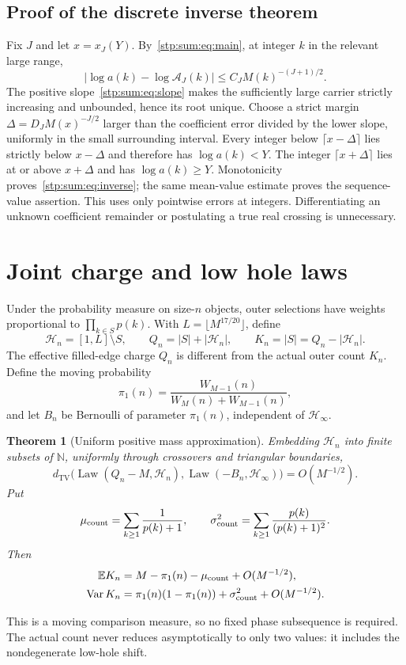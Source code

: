 \documentclass[11pt]{article}
\newtheorem{theorem}{Theorem}[section]
\theoremstyle{remark}\newtheorem{remark}[theorem]{Remark}
\newcommand{\E}{\mathbb E}
\newcommand{\N}{\mathbb N}
\newcommand{\TV}{d_{\mathrm{TV}}}
\newcommand{\cA}{\mathcal A}
\newcommand{\cH}{\mathcal H}
\DeclareMathOperator{\Var}{Var}
\DeclareMathOperator{\Law}{Law}
\begin{document}
\subsection{Proof of the discrete inverse theorem}
Fix $J$ and let $x=x_J(Y)$. By~\eqref{stp:sum:eq:main}, at integer $k$ in the relevant large range,
\[
 |\log a(k)-\log\cA_J(k)|\le C_JM(k)^{-(J+1)/2}.
\]
The positive slope~\eqref{stp:sum:eq:slope} makes the sufficiently large carrier strictly increasing and unbounded, hence its root unique. Choose a strict margin $\Delta=D_JM(x)^{-J/2}$ larger than the coefficient error divided by the lower slope, uniformly in the small surrounding interval. Every integer below $\lceil x-\Delta\rceil$ lies strictly below $x-\Delta$ and therefore has $\log a(k)<Y$. The integer $\lceil x+\Delta\rceil$ lies at or above $x+\Delta$ and has $\log a(k)\ge Y$. Monotonicity proves~\eqref{stp:sum:eq:inverse}; the same mean-value estimate proves the sequence-value assertion. This uses only pointwise errors at integers. Differentiating an unknown coefficient remainder or postulating a true real crossing is unnecessary.

\section{Joint charge and low hole laws}
\label{stp:sum:sec:TV}
Under the probability measure on size-$n$ objects, outer selections have weights proportional to $\prod_{k\in S}p(k)$. With $L=\lfloor M^{17/20}\rfloor$, define
\[
 \cH_n=[1,L]\setminus S,\qquad Q_n=|S|+|\cH_n|,
 \qquad K_n=|S|=Q_n-|\cH_n|.
\]
The effective filled-edge charge $Q_n$ is different from the actual outer count $K_n$. Define the moving probability
\[
 \pi_1(n)=\frac{W_{M-1}(n)}{W_M(n)+W_{M-1}(n)},
\]
and let $B_n$ be Bernoulli of parameter $\pi_1(n)$, independent of $\cH_\infty$.

\begin{theorem}[Uniform positive mass approximation]\label{stp:sum:thm:TV}
Embedding $\cH_n$ into finite subsets of $\N$, uniformly through crossovers and triangular boundaries,
\begin{equation}\label{stp:sum:eq:TV}
 \TV\bigl(\Law(Q_n-M,\cH_n),\Law(-B_n,\cH_\infty)\bigr)
 =O(M^{-1/2}).
\end{equation}
Put
\[
 \mu_{\rm count}=\sum_{k\ge1}\frac1{p(k)+1},\qquad
 \sigma_{\rm count}^2=\sum_{k\ge1}\frac{p(k)}{(p(k)+1)^2}.
\]
Then
\begin{align}
 \E K_n&=M-\pi_1(n)-\mu_{\rm count}+O(M^{-1/2}),\label{stp:sum:eq:countmean}\\
 \Var K_n&=\pi_1(n)(1-\pi_1(n))+\sigma_{\rm count}^2+O(M^{-1/2}).
 \label{stp:sum:eq:countvar}
\end{align}
\end{theorem}
This is a moving comparison measure, so no fixed phase subsequence is required. The actual count never reduces asymptotically to only two values: it includes the nondegenerate low-hole shift.
\end{document}

